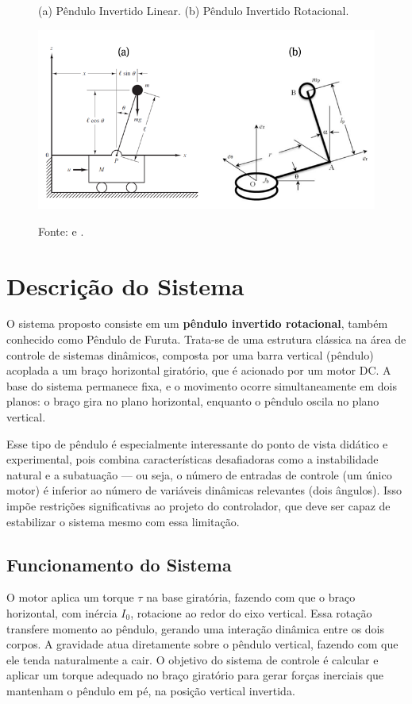 \documentclass[9pt,a4paper,twocolumn,twoside]{tau-class/tau}
\begin{document}
    \begin{figure}[H]
    \centering
    \caption{(a) Pêndulo Invertido Linear. (b) Pêndulo Invertido Rotacional.}
    \includegraphics[width=0.8\columnwidth]{figures/pendulos.png}
    \label{fig:pendulos} 
    \caption*{Fonte: \cite{Ogata2010} e \cite{Nath2014}.}
\end{figure}


\section{Descrição do Sistema}

    O sistema proposto consiste em um \textbf{pêndulo invertido rotacional}, também conhecido como Pêndulo de Furuta. Trata-se de uma estrutura clássica na área de controle de sistemas dinâmicos, composta por uma barra vertical (pêndulo) acoplada a um braço horizontal giratório, que é acionado por um motor DC. A base do sistema permanece fixa, e o movimento ocorre simultaneamente em dois planos: o braço gira no plano horizontal, enquanto o pêndulo oscila no plano vertical.

    Esse tipo de pêndulo é especialmente interessante do ponto de vista didático e experimental, pois combina características desafiadoras como a instabilidade natural e a subatuação — ou seja, o número de entradas de controle (um único motor) é inferior ao número de variáveis dinâmicas relevantes (dois ângulos). Isso impõe restrições significativas ao projeto do controlador, que deve ser capaz de estabilizar o sistema mesmo com essa limitação.

    \subsection{Funcionamento do Sistema}
    
    O motor aplica um torque $\tau$ na base giratória, fazendo com que o braço horizontal, com inércia $I_0$, rotacione ao redor do eixo vertical. Essa rotação transfere momento ao pêndulo, gerando uma interação dinâmica entre os dois corpos. A gravidade atua diretamente sobre o pêndulo vertical, fazendo com que ele tenda naturalmente a cair. O objetivo do sistema de controle é calcular e aplicar um torque adequado no braço giratório para gerar forças inerciais que mantenham o pêndulo em pé, na posição vertical invertida.
\end{document}
